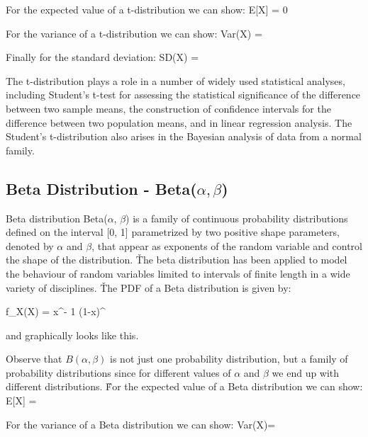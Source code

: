 \vspace{10pt}

For the expected value of a t-distribution we can show:
\bse
E[X] = 0
\ese

For the variance of a t-distribution we can show:
\bse
Var(X) = 
\ese

Finally for the standard deviation:
\bse
SD(X) = 
\ese

The t-distribution plays a role in a number of widely used statistical analyses, including Student's t-test for
assessing the statistical significance of the difference between two sample means, the construction of confidence
intervals for the difference between two population means, and in linear regression analysis. The Student's
t-distribution also arises in the Bayesian analysis of data from a normal family.

\subsection{Beta Distribution - Beta($\alpha, \beta$)}

Beta distribution Beta($\alpha$, $\beta$) is a family of continuous probability distributions defined on the interval
[0, 1] parametrized by two positive shape parameters, denoted by $\alpha$ and $\beta$, that appear as exponents of
the random variable and control the shape of the distribution. \v

The beta distribution has been applied to model the behaviour of random variables limited to intervals of finite
length in a wide variety of disciplines. \v

The PDF of a Beta distribution is given by:

\bse
f_{X}(X) =  \cdot x^{\alpha - 1} \cdot (1-x)^{}
\ese
\ed

and graphically looks like this.

\vspace{10pt}

Observe that $B(\alpha, \beta)$ is not just one probability distribution, but a family of probability distributions
since for different values of $\alpha$ and $\beta$ we end up with different distributions. \v

For the expected value of a Beta distribution we can show:
\bse
E[X] = \frac{\alpha}{\alpha+\beta}
\ese

For the variance of a Beta distribution we can show:
\bse
Var(X)= 
\ese

